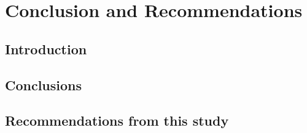 \label{chapter5}


\chapter{Conclusion and Recommendations}
\section{Introduction}

\section{Conclusions}

\section{Recommendations from this study}


